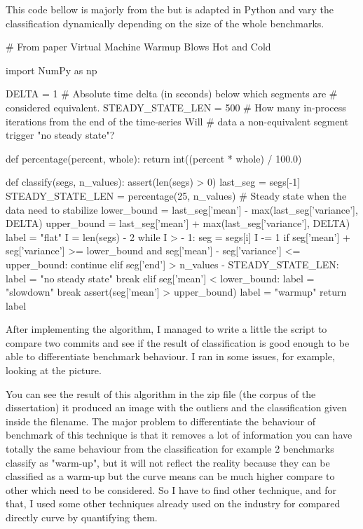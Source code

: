 \documentclass{article}
\begin{document}
This code bellow is majorly from the \citep{barrett2017virtual} but is adapted in Python and vary the classification dynamically depending on the size of the whole benchmarks.
\begin{python}[h!]

# From paper Virtual Machine Warmup Blows Hot and Cold

import NumPy as np


DELTA = 1  # Absolute time delta (in seconds) below which segments are
# considered equivalent.
STEADY_STATE_LEN = 500  # How many in-process iterations from the end of the time-series
Will # data a non-equivalent segment trigger "no steady state"?


def percentage(percent, whole):
    return int((percent * whole) / 100.0)


def classify(segs, n_values):
    assert(len(segs) > 0)
    last_seg = segs[-1]
    STEADY_STATE_LEN = percentage(25, n_values) # Steady state when the data need to stabilize
    lower_bound = last_seg['mean'] - max(last_seg['variance'], DELTA)
    upper_bound = last_seg['mean'] + max(last_seg['variance'], DELTA)
    label = "flat"
    I = len(segs) - 2
    while I > - 1:
        seg = segs[i]
        I -= 1
        if seg['mean'] + seg['variance'] >= lower_bound and seg['mean'] - seg['variance'] <= upper_bound:
            continue
        elif seg['end'] > n_values - STEADY_STATE_LEN:
            label = "no steady state"
            break
        elif seg['mean'] < lower_bound:
            label = "slowdown"
            break
        assert(seg['mean'] > upper_bound)
        label = "warmup"
    return label
\end{python}

After implementing the algorithm, I managed to write a little the script to compare two commits and see if the result of classification is good enough to be able to differentiate benchmark behaviour.
I ran in some issues, for example, looking at the picture.


You can see the result of this algorithm in the zip file (the corpus of the dissertation) it produced an image with the outliers and the classification given inside the filename.
The major problem to differentiate the behaviour of benchmark of this technique is that it removes a lot of information you can have totally the same behaviour from the classification for example 2 benchmarks classify as "warm-up", but it will not reflect the reality because they can be classified as a warm-up but the curve means can be much higher compare to other which need to be considered. So I have to find other technique, and for that, I used some other techniques already used on the industry for compared directly curve by quantifying them.
\end{document}
